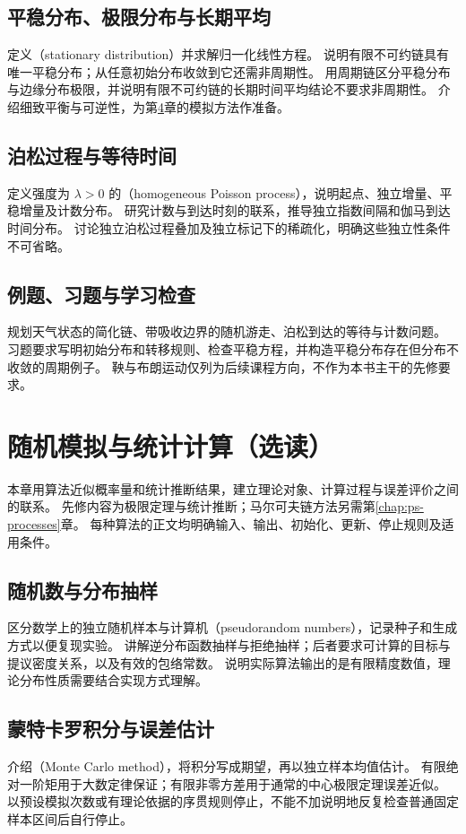 \documentclass[UTF8,12pt,a4paper,fontset=fandol]{ctexbook}
\begin{document}
\section{平稳分布、极限分布与长期平均}
\label{sec:ps-stationarity}
定义（stationary distribution）并求解归一化线性方程。
说明有限不可约链具有唯一平稳分布；从任意初始分布收敛到它还需非周期性。
用周期链区分平稳分布与边缘分布极限，并说明有限不可约链的长期时间平均结论不要求非周期性。
介绍细致平衡与可逆性，为第\ref{chap:ps-computation}章的模拟方法作准备。

\section{泊松过程与等待时间}
\label{sec:ps-poisson-process}
定义强度为 $\lambda>0$ 的（homogeneous Poisson process），说明起点、独立增量、平稳增量及计数分布。
研究计数与到达时刻的联系，推导独立指数间隔和伽马到达时间分布。
讨论独立泊松过程叠加及独立标记下的稀疏化，明确这些独立性条件不可省略。

\section{例题、习题与学习检查}
规划天气状态的简化链、带吸收边界的随机游走、泊松到达的等待与计数问题。
习题要求写明初始分布和转移规则、检查平稳方程，并构造平稳分布存在但分布不收敛的周期例子。
鞅与布朗运动仅列为后续课程方向，不作为本书主干的先修要求。


\chapter{随机模拟与统计计算（选读）}
\label{chap:ps-computation}

本章用算法近似概率量和统计推断结果，建立理论对象、计算过程与误差评价之间的联系。
先修内容为极限定理与统计推断；马尔可夫链方法另需第\ref{chap:ps-processes}章。
每种算法的正文均明确输入、输出、初始化、更新、停止规则及适用条件。

\section{随机数与分布抽样}
\label{sec:ps-random-generation}
区分数学上的独立随机样本与计算机（pseudorandom numbers），记录种子和生成方式以便复现实验。
讲解逆分布函数抽样与拒绝抽样；后者要求可计算的目标与提议密度关系，以及有效的包络常数。
说明实际算法输出的是有限精度数值，理论分布性质需要结合实现方式理解。

\section{蒙特卡罗积分与误差估计}
\label{sec:ps-monte-carlo}
介绍（Monte Carlo method），将积分写成期望，再以独立样本均值估计。
有限绝对一阶矩用于大数定律保证；有限非零方差用于通常的中心极限定理误差近似。
以预设模拟次数或有理论依据的序贯规则停止，不能不加说明地反复检查普通固定样本区间后自行停止。
\end{document}
